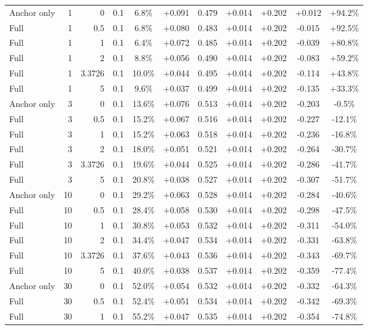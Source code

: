 \begin{table}[htbp]
\begin{tabular}{lrrrccccccc}
Anchor only & 1 & 0 & 0.1 & 6.8\% & +0.091 & 0.479 & +0.014 & +0.202 & +0.012 & +94.2\% \\
Full & 1 & 0.5 & 0.1 & 6.8\% & +0.080 & 0.483 & +0.014 & +0.202 & -0.015 & +92.5\% \\
Full & 1 & 1 & 0.1 & 6.4\% & +0.072 & 0.485 & +0.014 & +0.202 & -0.039 & +80.8\% \\
Full & 1 & 2 & 0.1 & 8.8\% & +0.056 & 0.490 & +0.014 & +0.202 & -0.083 & +59.2\% \\
Full & 1 & 3.3726 & 0.1 & 10.0\% & +0.044 & 0.495 & +0.014 & +0.202 & -0.114 & +43.8\% \\
Full & 1 & 5 & 0.1 & 9.6\% & +0.037 & 0.499 & +0.014 & +0.202 & -0.135 & +33.3\% \\
Anchor only & 3 & 0 & 0.1 & 13.6\% & +0.076 & 0.513 & +0.014 & +0.202 & -0.203 & -0.5\% \\
Full & 3 & 0.5 & 0.1 & 15.2\% & +0.067 & 0.516 & +0.014 & +0.202 & -0.227 & -12.1\% \\
Full & 3 & 1 & 0.1 & 15.2\% & +0.063 & 0.518 & +0.014 & +0.202 & -0.236 & -16.8\% \\
Full & 3 & 2 & 0.1 & 18.0\% & +0.051 & 0.521 & +0.014 & +0.202 & -0.264 & -30.7\% \\
Full & 3 & 3.3726 & 0.1 & 19.6\% & +0.044 & 0.525 & +0.014 & +0.202 & -0.286 & -41.7\% \\
Full & 3 & 5 & 0.1 & 20.8\% & +0.038 & 0.527 & +0.014 & +0.202 & -0.307 & -51.7\% \\
Anchor only & 10 & 0 & 0.1 & 29.2\% & +0.063 & 0.528 & +0.014 & +0.202 & -0.284 & -40.6\% \\
Full & 10 & 0.5 & 0.1 & 28.4\% & +0.058 & 0.530 & +0.014 & +0.202 & -0.298 & -47.5\% \\
Full & 10 & 1 & 0.1 & 30.8\% & +0.053 & 0.532 & +0.014 & +0.202 & -0.311 & -54.0\% \\
Full & 10 & 2 & 0.1 & 34.4\% & +0.047 & 0.534 & +0.014 & +0.202 & -0.331 & -63.8\% \\
Full & 10 & 3.3726 & 0.1 & 37.6\% & +0.043 & 0.536 & +0.014 & +0.202 & -0.343 & -69.7\% \\
Full & 10 & 5 & 0.1 & 40.0\% & +0.038 & 0.537 & +0.014 & +0.202 & -0.359 & -77.4\% \\
Anchor only & 30 & 0 & 0.1 & 52.0\% & +0.054 & 0.532 & +0.014 & +0.202 & -0.332 & -64.3\% \\
Full & 30 & 0.5 & 0.1 & 52.4\% & +0.051 & 0.534 & +0.014 & +0.202 & -0.342 & -69.3\% \\
Full & 30 & 1 & 0.1 & 55.2\% & +0.047 & 0.535 & +0.014 & +0.202 & -0.354 & -74.8\% \\

\end{tabular}
\end{table}
